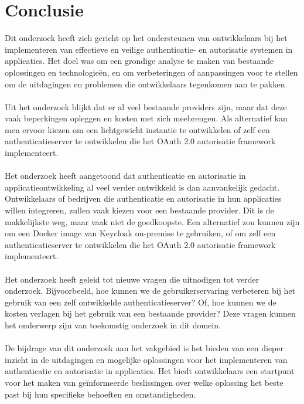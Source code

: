 
\chapter{Conclusie}%
\label{ch:conclusie}


Dit onderzoek heeft zich gericht op het ondersteunen van ontwikkelaars bij het implementeren van effectieve en veilige authenticatie- en autorisatie 
systemen in applicaties. Het doel was om een grondige analyse te maken van bestaande oplossingen en technologieën, en om verbeteringen of aanpassingen 
voor te stellen om de uitdagingen en problemen die ontwikkelaars tegenkomen aan te pakken. 
\\\\
Uit het onderzoek blijkt dat er al veel bestaande providers zijn, maar dat deze vaak beperkingen opleggen en kosten met zich meebrengen. Als alternatief
kan men ervoor kiezen om een lichtgewicht instantie te ontwikkelen of zelf een authenticatieserver te ontwikkelen die het OAuth 2.0 autorisatie framework
implementeert.
\\\\
Het onderzoek heeft aangetoond dat authenticatie en autorisatie in applicatieontwikkeling al veel verder ontwikkeld is dan aanvankelijk gedacht.
Ontwikkelaars of bedrijven die authenticatie en autorisatie in hun applicaties willen integreren, zullen vaak kiezen voor een bestaande provider.
Dit is de makkelijkste weg, maar vaak niet de goedkoopste. Een alternatief zou kunnen zijn om een Docker image van Keycloak on-premise te gebruiken,
of om zelf een authenticatieserver te ontwikkelen die het OAuth 2.0 autorisatie framework implementeert.
\\\\
Het onderzoek heeft geleid tot nieuwe vragen die uitnodigen tot verder onderzoek. Bijvoorbeeld, hoe kunnen we de gebruikerservaring verbeteren bij
het gebruik van een zelf ontwikkelde authenticatieserver? Of, hoe kunnen we de kosten verlagen bij het gebruik van een bestaande provider? Deze vragen
kunnen het onderwerp zijn van toekomstig onderzoek in dit domein.
\\\\
De bijdrage van dit onderzoek aan het vakgebied is het bieden van een dieper inzicht in de uitdagingen en mogelijke oplossingen voor het implementeren
van authenticatie en autorisatie in applicaties. Het biedt ontwikkelaars een startpunt voor het maken van geïnformeerde beslissingen over welke oplossing
het beste past bij hun specifieke behoeften en omstandigheden.
